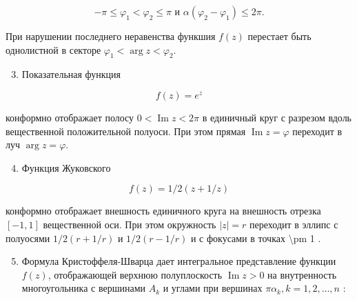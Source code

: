 \documentclass[10pt]{article}
\begin{document}
\[

-\pi \leqslant \varphi_{1}<\varphi_{2} \leqslant \pi \text { и } \alpha\left(\varphi_{2}-\varphi_{1}\right) \leqslant 2 \pi .

\]



При нарушении последнего неравенства функшия $f(z)$ перестает быть однолистной в секторе $\varphi_{1}<\arg z<\varphi_{2}$.



\begin{enumerate}

  \setcounter{enumi}{2}

  \item Показательная функция

\end{enumerate}



\[

f(z)=e^{z}

\]



конформно отображает полосу $0<\operatorname{Im} z<2 \pi$ в единичный круг с разрезом вдоль вещественной положительной полуоси. При этом прямая $\operatorname{Im} z=\varphi$ переходит в луч $\arg z=\varphi$.



\begin{enumerate}

  \setcounter{enumi}{3}

  \item Функция Жуковского

\end{enumerate}



\[

f(z)=1 / 2(z+1 / z)

\]



конформно отображает внешность единичного круга на внешность отрезка $[-1,1]$ вещественной оси. При этом окружность $|z|=r$ переходит в эллипс с полуосями $1 / 2(r+1 / r)$ и $1 / 2(r-1 / r)$ и с фокусами в точках \textbackslash pm 1 .



\begin{enumerate}

  \setcounter{enumi}{4}

  \item Формула Кристоффеля-Шварца дает интегральное представление функции $f(z)$, отображающей верхнюю полуплоскость $\operatorname{Im} z>0$ на внутренность многоугольника с вершинами $A_{k}$ и углами при вершинах $\pi \alpha_{k}, k=1,2, \ldots, n$ :

\end{enumerate}
\end{document}
